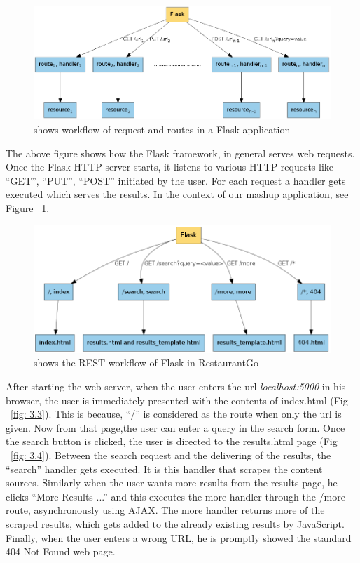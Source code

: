 \begin{figure}[!htb]
  \centering
  \includegraphics[width=16cm]{fig/flask.png}
  \caption[Workflow of a Flask application]
  {shows workflow of request and routes in a Flask application}
\end{figure}

The above figure shows how the Flask framework, in general serves web requests. Once the Flask HTTP server starts, it listens to various HTTP requests like “GET”, “PUT”, “POST” initiated by the user. For each request a handler gets executed which serves the results. In the context of our mashup application, see Figure ~\ref{fig: 3.6}.

\begin{figure}[!htb]
  \centering
  \includegraphics[width=16cm]{fig/rest.png}
  \caption[Workflow of RestaurantGo]
  {shows the REST workflow of Flask in RestaurantGo}
  \label{fig: 3.6}
\end{figure}



After starting the web server, when the user enters the url \emph{localhost:5000} in his browser, the user is immediately presented with the contents of index.html (Fig ~\ref{fig: 3.3}). This is because, “/” is considered as the route when only the url is given. Now from that page,the user can enter a query in the search form. Once the search button is clicked, the user is directed to the results.html page (Fig ~\ref{fig: 3.4}). Between the search request and the delivering of the results, the “search” handler gets executed. It is this handler that scrapes the content sources. Similarly when the user wants more results from the results page, he clicks ``More Results ...'' and this executes the more handler through the /more route, asynchronously using AJAX. The more handler returns more of the scraped results, which gets added to the already existing results by JavaScript. Finally, when the user enters a wrong URL, he is promptly showed the standard 404 Not Found web page.


